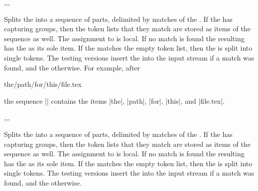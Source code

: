 \documentclass[oneside]{book}
\begin{document}
\begin{function}{\RegexSplit,\RegexSplitT,\RegexSplitF,\RegexSplitTF}
\begin{syntax}
   
    
    
     
\end{syntax}
Splits the  into a sequence of parts, delimited by
matches of the . If the 
has capturing groups, then the token lists that they match are stored as
items of the sequence as well. The assignment to  is local.
If no match is found the resulting  has the
 as its sole item. If the 
matches the empty token list, then the  is split
into single tokens.
The testing versions insert the  into the input
stream if a match was found, and the  otherwise.
For example, after
\begin{codehigh}
\SeqNew \lPathSeq
\RegexSplit {/} {the/path/for/this/file.tex} \lPathSeq
\end{codehigh}
the sequence |\lPathSeq| contains the items |{the}|, |{path}|,
|{for}|, |{this}|, and |{file.tex}|.
\end{function}

\begin{function}{\RegexVarSplit,\RegexVarSplitT,\RegexVarSplitF,\RegexVarSplitTF}
\begin{syntax}
   
    
    
     
\end{syntax}
Splits the  into a sequence of parts, delimited by
matches of the . If the 
has capturing groups, then the token lists that they match are stored as
items of the sequence as well. The assignment to  is local.
If no match is found the resulting  has the
 as its sole item. If the 
matches the empty token list, then the  is split
into single tokens.
The testing versions insert the  into the input
stream if a match was found, and the  otherwise.
\end{function}
\end{document}
